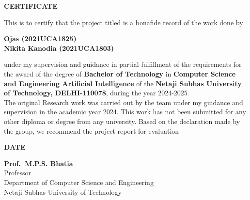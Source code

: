 \thispagestyle{plain}
\begin{center}
\large \large \textbf{CERTIFICATE}
\end{center}

\vspace{0.3cm}
\fontsize{12pt}{24pt}\selectfont This is to certify that the project titled \textbf{\btptitle} is a bonafide record of the work done by
\vspace{1.0cm}

\begin{center}
\textbf{Ojas (2021UCA1825)\\Nikita Kanodia (2021UCA1803)}
\end{center}

\vspace{1.0cm}
\noindent
\fontsize{12pt}{24pt}\selectfont under my supervision and guidance in partial fulfillment of the requirements for the award of the degree of \textbf{Bachelor of Technology} in \textbf{Computer Science and Engineering Artificial Intelligence} of the \textbf{Netaji Subhas University of Technology, DELHI-110078}, during the year 2024{-}2025.\\ \indent  The original Research work was carried out by the team under my guidance and supervision in the academic year 2024. This work has not been submitted for any other
 diploma or degree from any university. Based on the declaration made by the group, we
 recommend the project report for evaluation

\vspace{2.5cm}
\textbf{DATE\: }
\begin{flushright}
\vspace{2.5cm}
 \textbf{Prof.~M.P.S. Bhatia} \\
 Professor\\
 Department of Computer Science and Engineering\\
 Netaji Subhas University of Technology

\end{flushright}






\newpage